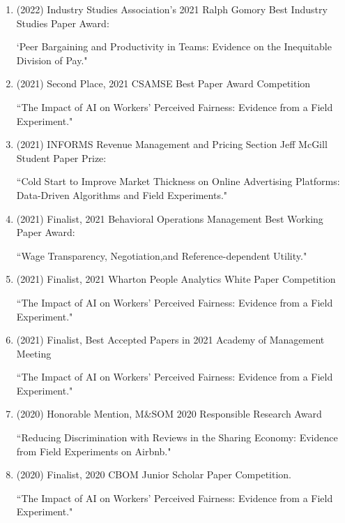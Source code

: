 \documentclass[10pt]{article}
\newenvironment{outerlist}[1][\enskip\textbullet]%
        {\begin{itemize}[#1,leftmargin=*]}{\end{itemize}%
         \vspace{-.6\baselineskip}}
\begin{document}
\begin{outerlist}
\begin{enumerate}
    {\footnotesize `Learning from Inventory Availability Information: Evidence from Field Experiments on Amazon."}

    \item (2022) Industry Studies Association’s 2021 Ralph Gomory Best Industry Studies Paper Award:
    
    {\footnotesize `Peer Bargaining and Productivity in Teams: Evidence on the Inequitable Division of Pay."}

    \item (2021) Second Place, 2021 CSAMSE Best Paper Award Competition

    {\footnotesize ``The Impact of AI on Workers' Perceived Fairness: Evidence from a Field Experiment."}
    
    \item (2021) INFORMS Revenue Management and Pricing Section Jeff McGill Student Paper Prize:
    
    {\footnotesize ``Cold Start to Improve Market Thickness on Online Advertising Platforms: Data-Driven Algorithms and Field Experiments."}
    
    
    \item (2021) Finalist, 2021 Behavioral Operations Management Best Working Paper Award:
    
    {\footnotesize ``Wage Transparency, Negotiation,and Reference-dependent Utility."}
    
    \item (2021) Finalist, 2021 Wharton People Analytics White Paper Competition
    
    {\footnotesize ``The Impact of AI on Workers' Perceived Fairness: Evidence from a Field Experiment."}


    \item (2021) Finalist, Best Accepted Papers in 2021 Academy of Management Meeting
    
    {\footnotesize ``The Impact of AI on Workers' Perceived Fairness: Evidence from a Field Experiment."}


    \item (2020) Honorable Mention, M\&SOM 2020 Responsible Research Award

    {\footnotesize ``Reducing Discrimination with Reviews in the Sharing Economy:  Evidence from Field Experiments on Airbnb."}


    \item (2020) Finalist, 2020 CBOM Junior Scholar Paper Competition.
    
    {\footnotesize ``The Impact of AI on Workers' Perceived Fairness: Evidence from a Field Experiment."}


\end{enumerate}
\end{outerlist}
\end{document}
